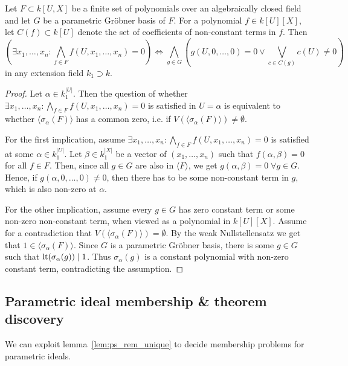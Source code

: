 \begin{theorem}
  Let $F \subset k[U, X]$ be a finite set of polynomials over an algebraically closed field and let $G$ be a parametric Gröbner basis of $F$. For a polynomial $f \in k[U][X]$, let $C(f) \subset k[U]$ denote the set of coefficients of non-constant terms in $f$. Then \[ \left(\exists x_{1}, \dots, x_{n} : \bigwedge_{f \in F} f(U, x_{1}, \dots, x_{n}) = 0 \right) \iff \bigwedge_{g \in G} \left( g(U, 0, \dots, 0) = 0 \lor \bigvee_{c \in C(g)} c(U) \neq 0 \right)\] in any extension field $k_{1} \supset k$.
\end{theorem}
\begin{proof}
  Let $\alpha \in k_{1}^{|U|}$. Then the question of whether $\exists x_{1}, \dots, x_{n} : \bigwedge_{f \in F} f(U, x_{1}, \dots, x_{n}) = 0$ is satisfied in $U = \alpha$ is equivalent to whether $\langle \sigma_{\alpha}(F) \rangle$ has a common zero, i.e. if $V(\langle \sigma_{\alpha}(F) \rangle) \neq \emptyset$.

  For the first implication, assume $\exists x_{1}, \dots, x_{n} : \bigwedge_{f \in F} f(U, x_{1}, \dots, x_{n}) = 0$ is satisfied at some $\alpha \in k_{1}^{|U|}$. Let $\beta \in k_{1}^{|X|}$ be a vector of $(x_{1}, \dots, x_{n})$ such that $f(\alpha, \beta) = 0$ for all $f \in F$. Then, since all $g \in G$ are also in $\langle F \rangle$, we get $g(\alpha, \beta) = 0 \; \forall g \in G$. Hence, if $g(\alpha, 0, \dots, 0) \neq 0$, then there has to be some non-constant term in $g$, which is also non-zero at $\alpha$.

  For the other implication, assume every $g \in G$ has zero constant term or some non-zero non-constant term, when viewed as a polynomial in $k[U][X]$. Assume for a contradiction that $V(\langle \sigma_{\alpha}(F) \rangle) = \emptyset$. By the weak Nullstellensatz we get that $1 \in \langle \sigma_{\alpha}(F) \rangle$. Since $G$ is a parametric Gröbner basis, there is some $g \in G$ such that $\operatorname{lt}(\sigma_{\alpha}(g)) \mid 1$. Thus $\sigma_{\alpha}(g)$ is a constant polynomial with non-zero constant term, contradicting the assumption.
\end{proof}


















\subsection{Parametric ideal membership \& theorem discovery}\label{sec:ps_div_app}
We can exploit lemma~\ref{lem:ps_rem_unique} to decide membership problems for parametric ideals.

